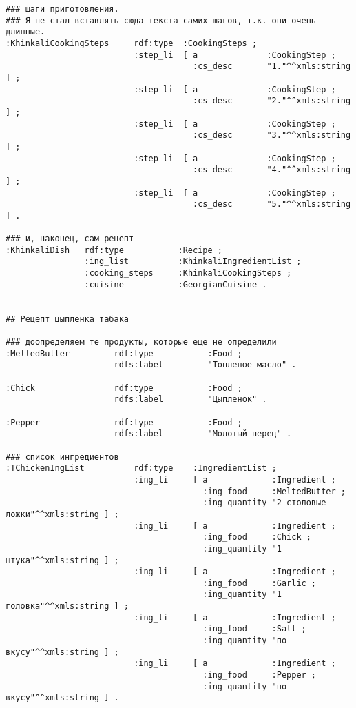 \documentclass{article}
\begin{document}
\begin{verbatim}
### шаги приготовления.
### Я не стал вставлять сюда текста самих шагов, т.к. они очень длинные.
:KhinkaliCookingSteps     rdf:type  :CookingSteps ;
                          :step_li  [ a              :CookingStep ;
                                      :cs_desc       "1."^^xmls:string ] ;
                          :step_li  [ a              :CookingStep ;
                                      :cs_desc       "2."^^xmls:string ] ;
                          :step_li  [ a              :CookingStep ;
                                      :cs_desc       "3."^^xmls:string ] ;
                          :step_li  [ a              :CookingStep ;
                                      :cs_desc       "4."^^xmls:string ] ;
                          :step_li  [ a              :CookingStep ;
                                      :cs_desc       "5."^^xmls:string ] .

### и, наконец, сам рецепт
:KhinkaliDish   rdf:type           :Recipe ;
                :ing_list          :KhinkaliIngredientList ;
                :cooking_steps     :KhinkaliCookingSteps ;
                :cuisine           :GeorgianCuisine .


## Рецепт цыпленка табака

### доопределяем те продукты, которые еще не определили
:MeltedButter         rdf:type           :Food ;
                      rdfs:label         "Топленое масло" .

:Chick                rdf:type           :Food ;
                      rdfs:label         "Цыпленок" .

:Pepper               rdf:type           :Food ;
                      rdfs:label         "Молотый перец" .

### список ингредиентов
:TChickenIngList          rdf:type    :IngredientList ;
                          :ing_li     [ a             :Ingredient ;
                                        :ing_food     :MeltedButter ;
                                        :ing_quantity "2 столовые ложки"^^xmls:string ] ;
                          :ing_li     [ a             :Ingredient ;
                                        :ing_food     :Chick ;
                                        :ing_quantity "1 штука"^^xmls:string ] ;
                          :ing_li     [ a             :Ingredient ;
                                        :ing_food     :Garlic ;
                                        :ing_quantity "1 головка"^^xmls:string ] ;
                          :ing_li     [ a             :Ingredient ;
                                        :ing_food     :Salt ;
                                        :ing_quantity "по вкусу"^^xmls:string ] ;
                          :ing_li     [ a             :Ingredient ;
                                        :ing_food     :Pepper ;
                                        :ing_quantity "по вкусу"^^xmls:string ] .


\end{verbatim}
\end{document}
